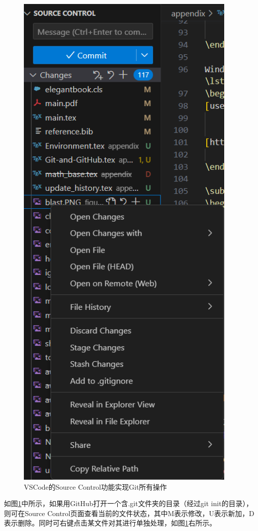 \begin{figure}[ht]
\begin{minipage}[c]{0.2\textwidth}
        \includegraphics[width=0.95\textwidth]{image/git/github-source-con3.png}
    \end{minipage}
    \caption{VSCode的Source Control功能实现Git所有操作}
    \label{source-con}
\end{figure}

如图\ref{source-con}中所示，如果用GitHub打开一个含.git文件夹的目录（经过git init的目录），则可在Source Control页面查看当前的文件状态，其中M表示修改，U表示新加，D表示删除。同时可右键点击某文件对其进行单独处理，如图\ref{source-con}右所示。